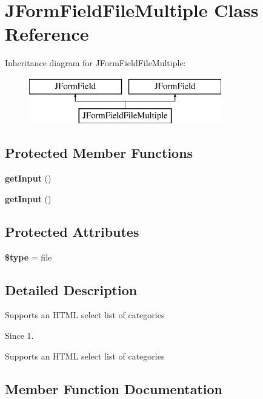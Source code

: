 \section{J\+Form\+Field\+File\+Multiple Class Reference}
\label{class_j_form_field_file_multiple}
Inheritance diagram for J\+Form\+Field\+File\+Multiple\+:\begin{figure}[H]
\begin{center}
\leavevmode
\includegraphics[height=2.000000cm]{class_j_form_field_file_multiple}
\end{center}
\end{figure}
\subsection*{Protected Member Functions}
\begin{DoxyCompactItemize}
\item 
\textbf{ get\+Input} ()
\item 
\textbf{ get\+Input} ()
\end{DoxyCompactItemize}
\subsection*{Protected Attributes}
\begin{DoxyCompactItemize}
\item 
\textbf{ \$type} = \textquotesingle{}file\textquotesingle{}
\end{DoxyCompactItemize}


\subsection{Detailed Description}
Supports an H\+T\+ML select list of categories

\begin{DoxySince}{Since}
1.
\end{DoxySince}
Supports an H\+T\+ML select list of categories 

\subsection{Member Function Documentation}
\mbox{\label{class_j_form_field_file_multiple_a4380f30ae9202fa49ebd2439572f9cdb}} 
